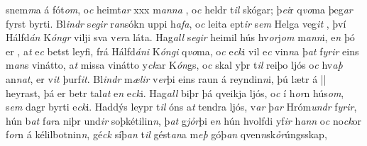 snem\textit{m}a  á fót\textit{om}, o\textit{c} heimt\textit{ar}
xxx m\textit{anna} , o\textit{c} heldr t\textit{il} skógar;  þ\textit{ei}r
q\textit{vo}ma þeg\textit{ar} fyrst byrti. Bl\textit{indr} s\textit{egir}  r\textit{an}sókn uppi h\textit{afa}, o\textit{c} leita
ept\textit{ir}  s\textit{em} Helga veg\textit{it} , því  Hálfd\textit{án} K\textit{óngr} vilji sva v\textit{er}a
láta. Hag\textit{all} s\textit{egir} heimil   hús   hv\textit{or}j\textit{om} m\textit{ann}i, e\textit{n} þó er  , a\textit{t} e\textit{c}  betst leyfi,   frá Hálfd\textit{áni} K\textit{óngi} q\textit{vo}ma, o\textit{c}
e\textit{ck}i vil e\textit{c} vin\textit{n}a þ\textit{at} f\textit{yrir} eins m\textit{an}s vinátto, a\textit{t} missa vinátto
y\textit{ck}ar  K\textit{ón}gs, o\textit{c} skal yþr
t\textit{il} reiþo  ljós o\textit{c}
hv\textit{aþ} an\textit{n}\textit{at}, er v\textit{it} þurf\textit{it}.  Bl\textit{indr} m\textit{ælir} v\textit{er}þi eins raun á
reyndin\textit{n}i,   þú lætr á || heyrast, þá er betr tal\textit{at} e\textit{n} e\textit{ck}i.
Hag\textit{all} biþr þá   qveikja ljós, o\textit{c}  í h\textit{or}n hús\textit{om}, s\textit{em} dagr byrti e\textit{ck}i.
Haddýs  leypr t\textit{il}  óns  a\textit{t}  tendra  ljós, v\textit{ar} þ\textit{ar}
Hróm\textit{undr} f\textit{yrir}, hún b\textit{at}  f\textit{ar}a niþr und\textit{ir} soþkétilin\textit{n}, þ\textit{at}
g\textit{jỏr}þi   e\textit{n} hún hvolfdi   yf\textit{ir} h\textit{ann} o\textit{c}  no\textit{ck}or f\textit{or}n   á  kélilbotnin\textit{n}, gé\textit{ck} síþ\textit{an}
t\textit{il} gést\textit{an}a m\textit{eþ} góþ\textit{an} qven\textit{n}sk\textit{ỏr}úngsskap, 
